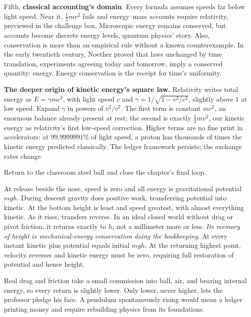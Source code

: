 Fifth, \textbf{classical accounting's domain}. Every formula assumes speeds far below light speed. Near it, \(\frac{1}{2}mv^2\) fails and energy--mass accounts require relativity, previewed in the challenge box. Microscopic energy remains conserved, but accounts become discrete energy levels, quantum physics' story. Also, conservation is more than an empirical rule without a known counterexample. In the early twentieth century, Noether proved that laws unchanged by time translation, experiments agreeing today and tomorrow, imply a conserved quantity: energy. Energy conservation is the receipt for time's uniformity.

\begin{challenge}
\textbf{The deeper origin of kinetic energy's square law.} Relativity writes total energy as \(E=\gamma mc^{2}\), with light speed \(c\) and \(\gamma=1/\sqrt{1-v^{2}/c^{2}}\), slightly above \(1\) at low speed. Expand \(\gamma\) in powers of \(v^{2}/c^{2}\). The first term is constant \(mc^{2}\), an enormous balance already present at rest; the second is exactly \(\frac{1}{2}mv^{2}\), our kinetic energy as relativity's first low-speed correction. Higher terms are no fine print in accelerators: at \(99.9999991\%\) of light speed, a proton has thousands of times the kinetic energy predicted classically. The ledger framework persists; the exchange rates change.
\end{challenge}


Return to the classroom steel ball and close the chapter's final loop.

At release beside the nose, speed is zero and all energy is gravitational potential \(mgh\). During descent gravity does positive work, transferring potential into kinetic. At the bottom height is least and speed greatest, with almost everything kinetic. As it rises, transfers reverse. In an ideal closed world without drag or pivot friction, it returns exactly to \(h\), not a millimeter more or less. \emph{Its memory of height is mechanical-energy conservation doing the bookkeeping}. At every instant kinetic plus potential equals initial \(mgh\). At the returning highest point, velocity reverses and kinetic energy must be zero, requiring full restoration of potential and hence height.

Real drag and friction take a small commission into ball, air, and bearing internal energy, so every return is slightly lower. Only lower, never higher, lets the professor pledge his face. A pendulum spontaneously rising would mean a ledger printing money and require rebuilding physics from its foundations.

